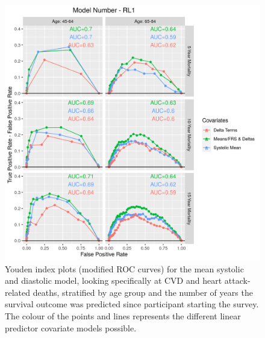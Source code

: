 \documentclass[
]{article}
\begin{document}
\begin{figure}
\centering
\includegraphics{./Rmarkdown_Plots/ROC_CAx-Covariates_EventType_RL1.png}
\caption{Youden index plots (modified ROC curves) for the mean systolic and diastolic model, looking specifically at CVD and heart attack-related deaths, stratified by age group and the number of years the survival outcome was predicted since participant starting the survey. The colour of the points and lines represents the different linear predictor covariate models possible.}\label{fig:ROC_RL1}
\end{figure}
\end{document}
